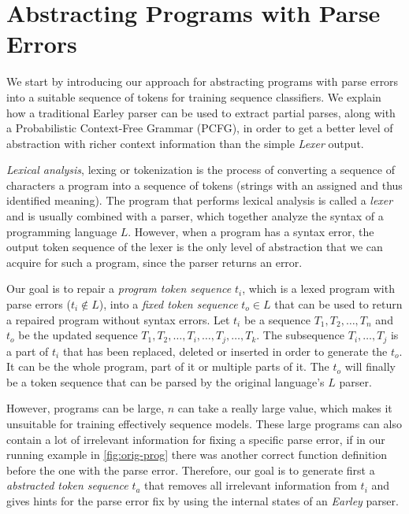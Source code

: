 \section{Abstracting Programs with Parse Errors}
\label{sec:prog-abstract}

We start by introducing our approach for abstracting programs with parse errors
into a suitable sequence of tokens for training sequence classifiers. We explain
how a traditional Earley parser can be used to extract partial parses, along
with a Probabilistic Context-Free Grammar (PCFG), in order to get a better level
of abstraction with richer context information than the simple \emph{Lexer}
output.

\emph{Lexical analysis}, lexing or tokenization is the process of converting a
sequence of characters \ie a program into a sequence of tokens (strings with an
assigned and thus identified meaning). The program that performs lexical
analysis is called a \emph{lexer} and is usually combined with a parser, which
together analyze the syntax of a programming language $L$. However, when a
program has a syntax error, the output token sequence of the lexer is the only
level of abstraction that we can acquire for such a program, since the parser
returns an error.

Our goal is to repair a \emph{program token sequence} $t_i$, which is a lexed
program with parse errors (\ie $t_i \notin L$), into a \emph{fixed token
sequence} $t_o \in L$ that can be used to return a repaired program without
syntax errors. Let $t_i$ be a sequence $T_1, T_2, \dots, T_n$ and $t_o$ be the
updated sequence $T_1, T_2, \dots, T_i, \dots, T_j, \dots, T_k$. The subsequence
$T_i, \dots, T_j$ is a part of $t_i$ that has been replaced, deleted or inserted
in order to generate the $t_o$. It can be the whole program, part of it or
multiple parts of it. The $t_o$ will finally be a token sequence that can be
parsed by the original language's $L$ parser.

However, programs can be large, \ie $n$ can take a really large value, which
makes it unsuitable for training effectively sequence models. These large
programs can also contain a lot of irrelevant information for fixing a specific
parse error, \eg if in our running example in \autoref{fig:orig-prog} there was
another correct function definition before the one with the parse error.
Therefore, our goal is to generate first a \emph{abstracted token sequence}
$t_a$ that removes all irrelevant information from $t_i$ and gives hints for the
parse error fix by using the internal states of an \emph{Earley} parser.



